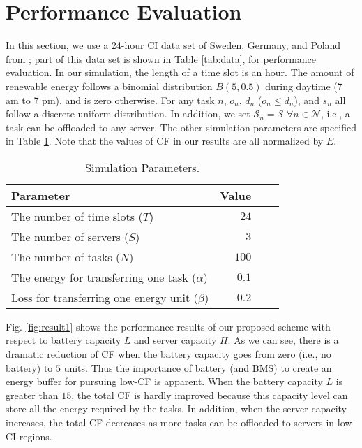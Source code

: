 \documentclass[conference, 10pt, ﬁnal, letterpaper, twocolumn]{IEEEtran}
\begin{document}

\section{Performance Evaluation}

In this section, we use a 24-hour CI data set of Sweden, Germany, and Poland from \cite{ElectricityMaps}; part of this data set is shown in Table \ref{tab:data}, for performance evaluation. In our simulation, the length of a time slot is an hour. The amount of renewable energy follows a binomial distribution $B(5, 0.5)$ \cite{coskun2011estimation} during daytime (7 am to 7 pm), and is zero otherwise. For any task $n$, $o_{n}$, $d_n$ ($o_n \leq d_n$), and $s_n$ all follow a discrete uniform distribution. In addition, we set $\mathcal{S}_n = \mathcal{S}$ $\forall n \in \mathcal{N}$, i.e., a task can be offloaded to any server. The other simulation parameters are specified in Table \ref{tab:parameters}. Note that the values of CF in our results are all normalized by $E$. 

\begin{table}[h]
    \caption{\label{tab:parameters}Simulation Parameters.}
    \footnotesize
    \begin{center}
        \begin{threeparttable}[b]
            \begin{tabular}{*{2}{lr}}
                \toprule
                \midrule
                {\bf Parameter} & {\bf Value}\\
                \midrule
                 The number of time slots ($T$) & $24$ \\
                 The number of servers ($S$) & $3$\\
                 The number of tasks ($N$) & $100$\\
                 The energy for transferring one task ($\alpha$) & $0.1$\\
                 Loss for transferring one energy unit ($\beta$) & $0.2$\\
                \bottomrule
            \end{tabular}
        \end{threeparttable}
    \end{center}
\end{table}



Fig. \ref{fig:result1} shows the performance results of our proposed scheme with respect to battery capacity $L$ and server capacity $H$. As we can see, there is a dramatic reduction of CF when the battery capacity goes from zero (i.e., no battery) to $5$ units. Thus the importance of battery (and BMS) to create an energy buffer for pursuing low-CF is apparent. When the battery capacity $L$ is greater than $15$, the total CF is hardly improved because this capacity level can store all the energy required by the tasks. In addition, when the server capacity increases, the total CF decreases as more tasks can be offloaded to servers in low-CI regions.
\end{document}
